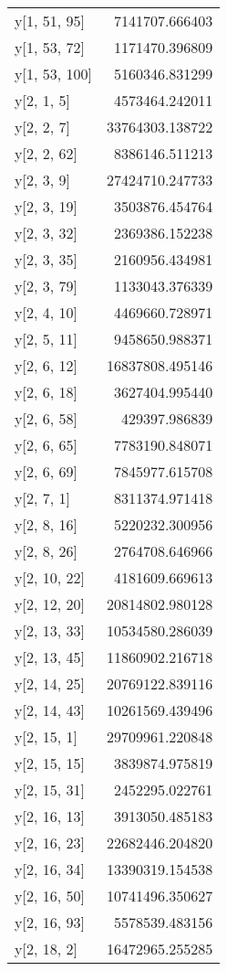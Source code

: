 \begin{longtable}{lr}
y[1, 51, 95] & 7141707.666403 \\
y[1, 53, 72] & 1171470.396809 \\
y[1, 53, 100] & 5160346.831299 \\
y[2, 1, 5] & 4573464.242011 \\
y[2, 2, 7] & 33764303.138722 \\
y[2, 2, 62] & 8386146.511213 \\
y[2, 3, 9] & 27424710.247733 \\
y[2, 3, 19] & 3503876.454764 \\
y[2, 3, 32] & 2369386.152238 \\
y[2, 3, 35] & 2160956.434981 \\
y[2, 3, 79] & 1133043.376339 \\
y[2, 4, 10] & 4469660.728971 \\
y[2, 5, 11] & 9458650.988371 \\
y[2, 6, 12] & 16837808.495146 \\
y[2, 6, 18] & 3627404.995440 \\
y[2, 6, 58] & 429397.986839 \\
y[2, 6, 65] & 7783190.848071 \\
y[2, 6, 69] & 7845977.615708 \\
y[2, 7, 1] & 8311374.971418 \\
y[2, 8, 16] & 5220232.300956 \\
y[2, 8, 26] & 2764708.646966 \\
y[2, 10, 22] & 4181609.669613 \\
y[2, 12, 20] & 20814802.980128 \\
y[2, 13, 33] & 10534580.286039 \\
y[2, 13, 45] & 11860902.216718 \\
y[2, 14, 25] & 20769122.839116 \\
y[2, 14, 43] & 10261569.439496 \\
y[2, 15, 1] & 29709961.220848 \\
y[2, 15, 15] & 3839874.975819 \\
y[2, 15, 31] & 2452295.022761 \\
y[2, 16, 13] & 3913050.485183 \\
y[2, 16, 23] & 22682446.204820 \\
y[2, 16, 34] & 13390319.154538 \\
y[2, 16, 50] & 10741496.350627 \\
y[2, 16, 93] & 5578539.483156 \\
y[2, 18, 2] & 16472965.255285 \\

\end{longtable}
